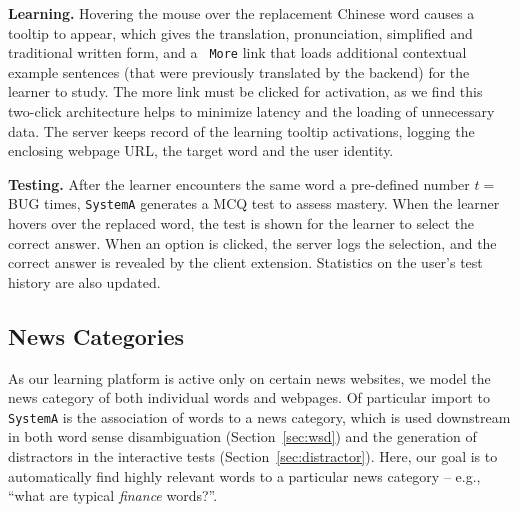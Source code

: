 \begin{CJK}{UTF8}{gbsn}
{\bf Learning.} Hovering the mouse over the replacement Chinese word
causes a tooltip to appear, which gives the translation,
pronunciation, simplified and traditional written form, and a {\tt
  More} link that loads additional contextual example sentences (that
were previously translated by the backend) for the learner to study.
The more link must be clicked for activation, as we find this
two-click architecture helps to minimize latency and the loading of
unnecessary data.  The server keeps record of the learning tooltip
activations, logging the enclosing webpage URL, the target word and
the user identity.


{\bf Testing.}  After the learner encounters the same word a
pre-defined number $t=$BUG times, {\tt SystemA} generates a MCQ test
to assess mastery.  When the learner hovers over the replaced word,
the test is shown for the learner to select the correct answer. When
an option is clicked, the server logs the selection, and the correct
answer is revealed by the client extension.  Statistics on the user's
test history are also updated.

\subsection{News Categories}
\label{subsec:category}

As our learning platform is active only on certain news websites, we
model the news category of both individual words and webpages.  Of
particular import to {\tt SystemA} is the association of words to a
news category, which is used downstream in both word sense
disambiguation (Section~\ref{sec:wsd}) and the generation of
distractors in the interactive tests (Section~\ref{sec:distractor}).
Here, our goal is to automatically find highly relevant words to a
particular news category -- e.g., ``what are typical {\it finance}
words?''.  


\end{CJK}
